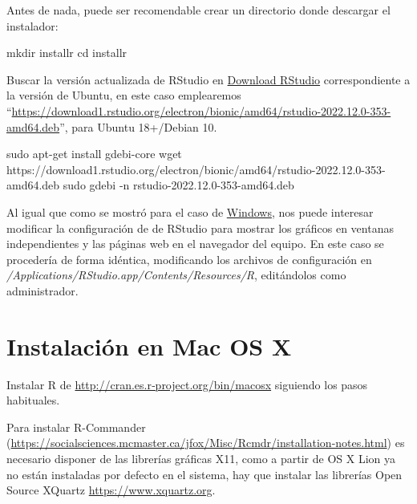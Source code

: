 \documentclass[
]{book}
\newenvironment{Shaded}{\begin{snugshade}}{\end{snugshade}}
\newcommand{\AttributeTok}[1]{\textcolor[rgb]{0.77,0.63,0.00}{#1}}
\newcommand{\BuiltInTok}[1]{#1}
\newcommand{\FunctionTok}[1]{\textcolor[rgb]{0.00,0.00,0.00}{#1}}
\newcommand{\NormalTok}[1]{#1}
\theoremstyle{break}
\theoremstyle{nonumberplain}
\begin{document}
Antes de nada, puede ser recomendable crear un directorio donde descargar el instalador:

\begin{Shaded}
\begin{Highlighting}[]
\FunctionTok{mkdir}\NormalTok{ installr}
\BuiltInTok{cd}\NormalTok{ installr}
\end{Highlighting}
\end{Shaded}

Buscar la versión actualizada de RStudio en \href{https://posit.co/download/rstudio-desktop}{Download RStudio} correspondiente a la versión de Ubuntu, en este caso emplearemos ``\url{https://download1.rstudio.org/electron/bionic/amd64/rstudio-2022.12.0-353-amd64.deb}'',
para Ubuntu 18+/Debian 10.

\begin{Shaded}
\begin{Highlighting}[]
\FunctionTok{sudo}\NormalTok{ apt{-}get install gdebi{-}core}
\FunctionTok{wget}\NormalTok{ https://download1.rstudio.org/electron/bionic/amd64/rstudio{-}2022.12.0{-}353{-}amd64.deb}
\FunctionTok{sudo}\NormalTok{ gdebi }\AttributeTok{{-}n}\NormalTok{ rstudio{-}2022.12.0{-}353{-}amd64.deb}
\end{Highlighting}
\end{Shaded}

Al igual que como se mostró para el caso de \protect\hyperlink{op-rstudio-win}{Windows}, nos puede interesar modificar la configuración de de RStudio para mostrar los gráficos en ventanas independientes y las páginas web en el navegador del equipo.
En este caso se procedería de forma idéntica, modificando los archivos de configuración en \emph{/Applications/RStudio.app/Contents/Resources/R}, editándolos como administrador.

\hypertarget{macosx}{%
\section{Instalación en Mac OS X}\label{macosx}}

Instalar R de \url{http://cran.es.r‐project.org/bin/macosx} siguiendo los pasos habituales.

Para instalar R-Commander (\url{https://socialsciences.mcmaster.ca/jfox/Misc/Rcmdr/installation-notes.html}) es necesario disponer de las librerías gráficas X11, como a partir de OS X Lion ya no están instaladas por defecto en el sistema, hay que instalar las librerías Open Source XQuartz \url{https://www.xquartz.org}.
\end{document}
